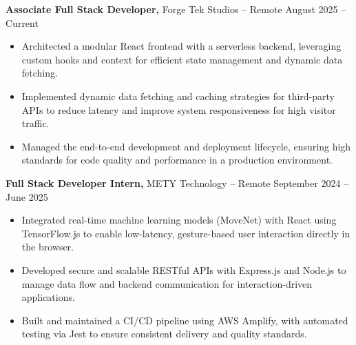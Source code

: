 \documentclass[11pt]{article}       %
\begin{document}
\textbf{Associate Full Stack Developer,} {Forge Tek Studios} -- Remote \hfill August 2025 -- Current 
\vspace{-9pt}
\begin{itemize}
  \item Architected a modular React frontend with a serverless backend, leveraging custom hooks and context for efficient state management and dynamic data fetching.
  \item Implemented dynamic data fetching and caching strategies for third-party APIs to reduce latency and improve system responsiveness for high visitor traffic.
  \item Managed the end-to-end development and deployment lifecycle, ensuring high standards for code quality and performance in a production environment.
\end{itemize}

\textbf{Full Stack Developer Intern,} {METY Technology} -- Remote \hfill September 2024 -- June 2025 
\vspace{-9pt}
\begin{itemize}
  \item Integrated real-time machine learning models (MoveNet) with React using TensorFlow.js to enable low-latency, gesture-based user interaction directly in the browser.
  \item Developed secure and scalable RESTful APIs with Express.js and Node.js to manage data flow and backend communication for interaction-driven applications.
  \item Built and maintained a CI/CD pipeline using AWS Amplify, with automated testing via Jest to ensure consistent delivery and quality standards.
\end{itemize}

\end{document}
